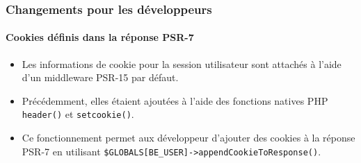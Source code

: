 %

\begin{frame}[fragile]
	\frametitle{Changements pour les développeurs}
	\framesubtitle{Cookies définis dans la réponse PSR-7}

	\begin{itemize}
		\item Les informations de cookie pour la session utilisateur sont attachés à
			l'aide d'un middleware PSR-15 par défaut.
		\item Précédemment, elles étaient ajoutées à l'aide des fonctions natives PHP \newline
			\smaller\texttt{header()} et \texttt{setcookie()}\normalsize.
		\item Ce fonctionnement permet aux développeur d'ajouter des cookies à la réponse PSR-7
			en utilisant\newline
			\smaller\texttt{\$GLOBALS[BE\_USER]->appendCookieToResponse()}\normalsize.
	\end{itemize}
\end{frame}

